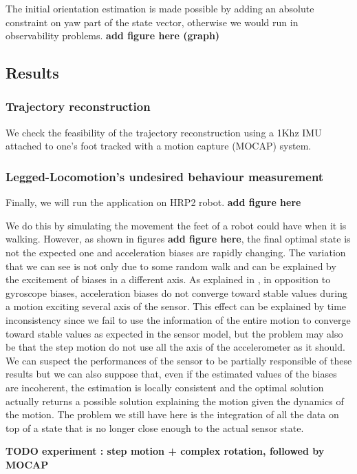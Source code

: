 The initial orientation estimation is made possible by adding an absolute constraint on yaw part of the state vector, otherwise we would run in observability problems. \textbf{add figure here (graph)}

\subsection{Results}
\subsubsection{Trajectory reconstruction}

We check the feasibility of the trajectory reconstruction using a 1Khz IMU attached to one's foot tracked with a motion capture (MOCAP) system. 

\subsubsection{Legged-Locomotion's undesired behaviour measurement}
Finally, we will run the application on HRP2 robot. \textbf{add figure here}




We do this by simulating the movement the feet of a robot could have when it is walking. However, as shown in figures \textbf{add figure here}, the final optimal state
is not the expected one and acceleration biases are rapidly changing. The variation that we can see is not only due to some random walk and can be explained by the excitement of biases in a different axis.
As explained in \cite{roussillon2011rt}, in opposition to gyroscope biases, acceleration biases do not converge toward stable values during a motion exciting several axis of the sensor. This effect can be explained by time inconsistency since we fail
to use the information of the entire motion to converge toward stable values as expected in the sensor model, but the problem may also be that the step motion do not use all the axis of the accelerometer as it should.
We can suspect the performances of the sensor to be partially responsible of these results but we can also suppose that, even if the estimated values of the biases are incoherent, the estimation is locally consistent and the optimal solution actually
returns a possible solution explaining the motion given the dynamics of the motion. The problem we still have here is the integration of all the data on top of a state that is no longer close enough to the actual sensor state.


\textbf{TODO experiment : step motion + complex rotation, followed by MOCAP}


